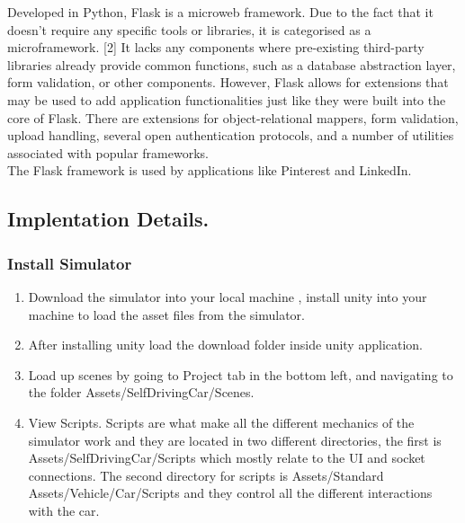 \documentclass[ 12pt,a4paper,twocolumn,fleqn]{article}
\begin{document}
\begin{enumerate}
     Developed in Python, Flask is a microweb framework. Due to the fact that it doesn't require any specific tools or libraries, it is categorised as a microframework. [2] It lacks any components where pre-existing third-party libraries already provide common functions, such as a database abstraction layer, form validation, or other components. However, Flask allows for extensions that may be used to add application functionalities just like they were built into the core of Flask. There are extensions for object-relational mappers, form validation, upload handling, several open authentication protocols, and a number of utilities associated with popular frameworks. \\
     The Flask framework is used by applications like Pinterest and LinkedIn.
\end{enumerate}

\subsection{ Implentation Details.}
\subsubsection{Install Simulator}
\begin{enumerate}
    \item Download the simulator into your local machine , install unity into your machine to load the asset files from the simulator.
    \item After installing unity load the download folder inside unity application. 
    \item Load up scenes by going to Project tab in the bottom left, and navigating to the folder Assets/SelfDrivingCar/Scenes.
    \item View Scripts. Scripts are what make all the different mechanics of the simulator work and they are located in two different directories, the first is Assets/SelfDrivingCar/Scripts which mostly relate to the UI and socket connections. The second directory for scripts is Assets/Standard Assets/Vehicle/Car/Scripts and they control all the different interactions with the car.
\end{enumerate}
\end{document}
